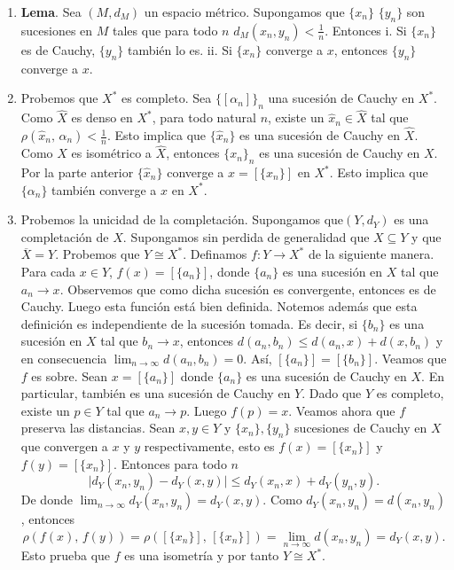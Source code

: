 \documentclass[x11names, 12pt]{book}
\begin{document}
\begin{enumerate}
\item \textbf{Lema}. Sea $(M, d_M)$ un espacio métrico. Supongamos que $\{x_n\}$ $\{y_n\} $ son sucesiones en $M$ tales que para todo $n$ $d_M(x_n, y_n)< \frac{1}{n}.$ Entonces i. Si $\{x_n\}$ es de Cauchy, $\{y_n\}$ también lo es. ii. Si $\{x_n\}$ converge a $x$, entonces $\{y_n\}$ converge a $x$.  

\item Probemos que $X^*$ es completo. Sea $\{[\alpha_n]\}_n$ una sucesión de Cauchy en $X^*$. Como $\hat{X}$ es denso en $X^*$, para todo natural $n$, existe un $\hat{x}_n \in \hat{X}$ tal que $\rho (\hat{x}_n, \, \alpha _n)< \frac{1}{n}.$ Esto implica que $\{\hat{x}_n\}$ es una sucesión de Cauchy en $\hat{X}$. Como $X $ es isométrico a  $\hat{X}$, entonces $\{x_n\}_n$ es una sucesión de Cauchy en $X$. Por la parte anterior $\{\hat{x}_n\}$ converge a $x=[\{x_n\}]$ en $X^*$. Esto implica que $\{\alpha _n\}$ también converge a $x$ en $X^*$.


\item Probemos la unicidad de la completación. Supongamos que$(Y, d_Y)$ es una completación de $X$. Supongamos sin perdida de generalidad que $X\subseteq Y$ y que $\overline{X}=Y$. Probemos que $Y\cong X^*$. Definamos $f:Y \to X^*$ de la siguiente manera. Para cada $x\in Y$, $f(x)=[\{a_n\}]$, donde $\{a_n\}$ es una sucesión  en $X$ tal que $a_n \to x$. Observemos que como dicha sucesión es convergente, entonces es de Cauchy. Luego esta función está bien definida. Notemos además que esta definición es independiente de la sucesión tomada. Es decir, si $\{b_n\}$ es una sucesión en $X$ tal que $b_n\to x$, entonces $d(a_n, b_n) \leq d(a_n, x)+d(x, b_n)$ y en consecuencia $\lim_{n\to \infty} d(a_n, b_n)=0$. Así,  $[\{a_n\}]=[\{b_n\}].$ Veamos que $f$ es sobre. Sean $x=[\{a_n\}]$ donde $\{ a_n\}$ es una sucesión de Cauchy en $X$. En particular, también es una sucesión de Cauchy en $Y$. Dado que $Y$ es completo, existe un $p\in Y$ tal que $a_n\to p$. Luego $f(p)=x$. Veamos ahora que $f$ preserva las distancias. Sean $x,y\in Y$ y $\{x_n\}, \{y_n\}$ sucesiones de Cauchy en $X$ que convergen a $x$ y $y$ respectivamente, esto es $f(x)=[\{x_n \}]$ y $f(y)=[\{x_n \}]$. Entonces para todo $n$
\[\mid  d_Y(x_n, y_n) -d_Y(x,y) \mid \leq d_Y(x_n, x)+d_Y(y_n, y) .\]
De donde $\lim_{n\to \infty} d_Y(x_n, y_n) = d_Y(x,y). $ Como $d_Y(x_n, y_n)=d(x_n, y_n)$, entonces
\[\rho(f(x),\, f(y) )=\rho([\{x_n \}],\, [\{x_n \}] )=  \lim_{n\to \infty} d(x_n, y_n) = d_Y(x,y) .\]
Esto prueba que $f$ es una isometría y por tanto $Y\cong X^*.$
\end{enumerate}
\end{document}
